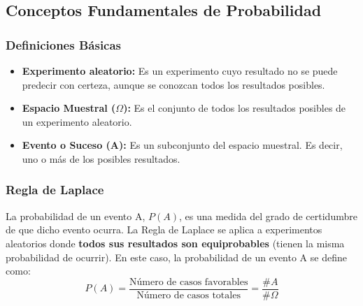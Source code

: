 \documentclass[12pt, letterpaper]{article}
\begin{document}
\subsection{Conceptos Fundamentales de Probabilidad}

\subsubsection{Definiciones Básicas}
\begin{itemize}
	\item \textbf{Experimento aleatorio:} Es un experimento cuyo resultado no se puede predecir con certeza, aunque se conozcan todos los resultados posibles.
	\item \textbf{Espacio Muestral ($\Omega$):} Es el conjunto de todos los resultados posibles de un experimento aleatorio.
	\item \textbf{Evento o Suceso (A):} Es un subconjunto del espacio muestral. Es decir, uno o más de los posibles resultados.
\end{itemize}

\subsubsection{Regla de Laplace}
La probabilidad de un evento A, $P(A)$, es una medida del grado de certidumbre de que dicho evento ocurra.
La Regla de Laplace se aplica a experimentos aleatorios donde \textbf{todos sus resultados son equiprobables} (tienen la misma probabilidad de ocurrir). En este caso, la probabilidad de un evento A se define como:
\[ P(A) = \frac{\text{Número de casos favorables}}{\text{Número de casos totales}} = \frac{\#A}{\#\Omega} \]
\end{document}
